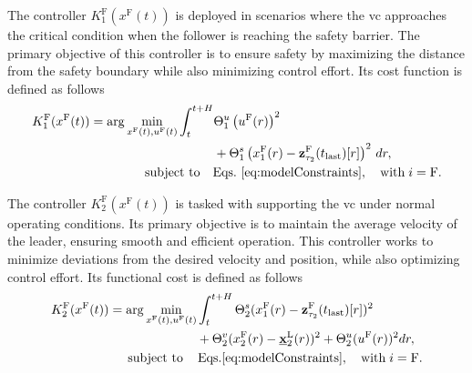 \begin{comment}
	\mathbf{z}_{\bar{\tau}}^\mathrm{F}(t_{\mathrm{last}})[t]
\end{comment}


The controller $K^{\mathrm{F}}_1(x^{\mathrm{F}}(t))$  is deployed in scenarios where the \gls{vc} approaches the critical condition when the follower is reaching the safety barrier. The primary objective of this controller is to ensure safety by maximizing the distance from the safety boundary while also minimizing control effort.  Its cost function is defined as follows
%
%
\begin{equation}
	\label{eq:K_1_controller}
	\begin{aligned}
		K^{\mathrm{F}}_1(x^\mathrm{F}(t)) = \arg \min_{x^{\mathrm{F}}(t), u^{\mathrm{F}}(t)} \int_{t}^{t+H} &  \Theta^u_1\left(u^\mathrm{F}(r)\right)^2  \\  
		& + \Theta^s_1\left(x_1^{\mathrm{F}}(r) - \mathbf{z}_{\tau_2}^\mathrm{F}(t_{\mathrm{last}})[r]\right)^2 \, dr, \\
		&\hspace{-1.9cm} \text{subject to} \quad \text{Eqs.}~\eqref{eq:modelConstraints}, \quad \mathrm{with} \; i = \mathrm{F}.
	\end{aligned}
\end{equation}
%

The controller $K^{\mathrm{F}}_2(x^{\mathrm{F}}(t))$ is tasked with supporting the \gls{vc} under normal operating conditions. Its primary objective is to maintain the average velocity of the leader, ensuring smooth and efficient operation. This controller works to minimize deviations from the desired velocity and position, while also optimizing control effort. Its functional cost is defined as follows
%
%
\begin{equation}
	\label{eq:K_2_controller}
	\begin{aligned}
		K^{\mathrm{F}}_2(x^\mathrm{F}(t)) = \arg  \min_{x^{\mathrm{F}}(t), u^{\mathrm{F}}(t)} &\int_{t}^{t+H} \Theta^s_2(x_1^{\mathrm{F}}(r)-\mathbf{z}_{\tau_2}^\mathrm{F}(t_{\mathrm{last}})[r])^2 \\ &+\Theta^v_2(x_2^{\mathrm{F}}(r)-\underline{\mathbf{x}}_2^\mathrm{L}(r))^2  +  \Theta^u_2(u^{\mathrm{F}}(r))^2 dr, \\
		&	\hspace{-1.9cm} \text{subject to} \qquad \hspace{-1cm}  \qquad \mathrm{Eqs.}\eqref{eq:modelConstraints}, \quad \mathrm{with} \; i = \mathrm{F}.
	\end{aligned}
\end{equation}


